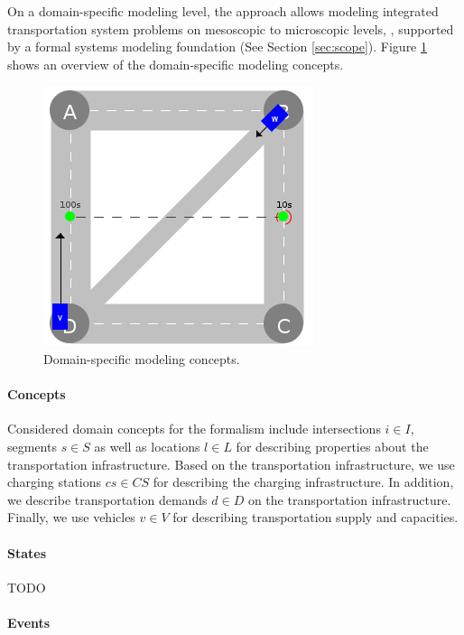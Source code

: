 \documentclass[a4paper,twoside]{article}
\begin{document}
	On a domain-specific modeling level, the approach allows modeling integrated transportation system problems on mesoscopic to microscopic levels, \cite{ascher_hackenberg_2014,ascher_hackenberg_2015}, supported by a formal systems modeling foundation \cite{ascher_hackenberg_2016,ascher_hackenberg_2017} (See Section  \ref{sec:scope}).
	Figure \ref{fig:domain-specific-modeling} shows an overview of the domain-specific modeling concepts.
	\begin{figure}[!ht]
		\centering
		\includegraphics[width=0.6\columnwidth]{../../events/demand.png}
		\caption{Domain-specific modeling concepts.}
		\label{fig:domain-specific-modeling}
	\end{figure}
	
	\paragraph{Concepts}
	
	Considered domain concepts for the formalism include intersections $i \in I$, segments $s \in S$ as well as locations $l \in L$ for describing properties about the transportation infrastructure.
	Based on the transportation infrastructure, we use charging stations $cs \in CS$ for describing the charging infrastructure. In addition, we describe transportation demands $d \in D$ on the transportation infrastructure.
	Finally, we use vehicles $v \in V$ for describing transportation supply and capacities.
	
	\paragraph{States}
	
	TODO
	
	\paragraph{Events}
	
\end{document}
